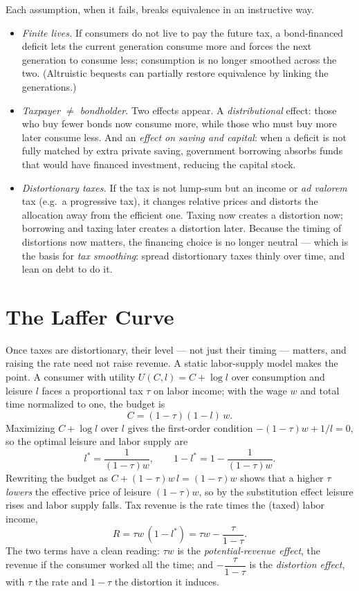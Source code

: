 Each assumption, when it fails, breaks equivalence in an instructive way.
\begin{itemize}
\item \emph{Finite lives.} If consumers do not live to pay the future tax, a bond-financed deficit lets the current generation consume more and forces the next generation to consume less; consumption is no longer smoothed across the two. (Altruistic bequests can partially restore equivalence by linking the generations.)
\item \emph{Taxpayer $\ne$ bondholder.} Two effects appear. A \emph{distributional} effect: those who buy fewer bonds now consume more, while those who must buy more later consume less. And an \emph{effect on saving and capital}: when a deficit is not fully matched by extra private saving, government borrowing absorbs funds that would have financed investment, reducing the capital stock.
\item \emph{Distortionary taxes.} If the tax is not lump-sum but an income or \emph{ad valorem} tax (e.g.\ a progressive tax), it changes relative prices and distorts the allocation away from the efficient one. Taxing now creates a distortion now; borrowing and taxing later creates a distortion later. Because the timing of distortions now matters, the financing choice is no longer neutral --- which is the basis for \emph{tax smoothing}: spread distortionary taxes thinly over time, and lean on debt to do it.
\end{itemize}

\section{The Laffer Curve}

Once taxes are distortionary, their level --- not just their timing --- matters, and raising the rate need not raise revenue. A static labor-supply model makes the point. A consumer with utility $U(C,l)=C+\log l$ over consumption and leisure $l$ faces a proportional tax $\tau$ on labor income; with the wage $w$ and total time normalized to one, the budget is
\[
C = (1-\tau)(1-l)\,w.
\]
Maximizing $C+\log l$ over $l$ gives the first-order condition $-(1-\tau)w + 1/l = 0$, so the optimal leisure and labor supply are
\[
l^{*} = \frac{1}{(1-\tau)w}, \qquad 1 - l^{*} = 1 - \frac{1}{(1-\tau)w}.
\]
Rewriting the budget as $C + (1-\tau)w\,l = (1-\tau)w$ shows that a higher $\tau$ \emph{lowers} the effective price of leisure $(1-\tau)w$, so by the substitution effect leisure rises and labor supply falls. Tax revenue is the rate times the (taxed) labor income,
\[
R = \tau w\,(1-l^{*}) = \tau w - \frac{\tau}{1-\tau}.
\]
The two terms have a clean reading: $\tau w$ is the \emph{potential-revenue effect}, the revenue if the consumer worked all the time; and $-\dfrac{\tau}{1-\tau}$ is the \emph{distortion effect}, with $\tau$ the rate and $1-\tau$ the distortion it induces.

